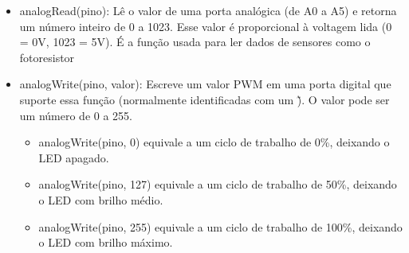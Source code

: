 \documentclass{report}
\begin{document}
	\begin{itemize}
		\item analogRead(pino): Lê o valor de uma porta analógica (de A0 a A5) e retorna um número inteiro de 0 a 1023. Esse valor é proporcional à voltagem lida (0 = 0V, 1023 = 5V). É a função usada para ler dados de sensores como o fotoresistor
		\item analogWrite(pino, valor): Escreve um valor PWM em uma porta digital que suporte essa função (normalmente identificadas com um \~). O valor pode ser um número de 0 a 255.
		\begin{itemize}
			\item analogWrite(pino, 0) equivale a um ciclo de trabalho de 0\%, deixando o LED apagado.
			\item analogWrite(pino, 127) equivale a um ciclo de trabalho de 50\%, deixando o LED com brilho médio.
			\item analogWrite(pino, 255) equivale a um ciclo de trabalho de 100\%, deixando o LED com brilho máximo.
			
		\end{itemize}
	\end{itemize}
	
	
	
	 
	

	

	
\end{document}
